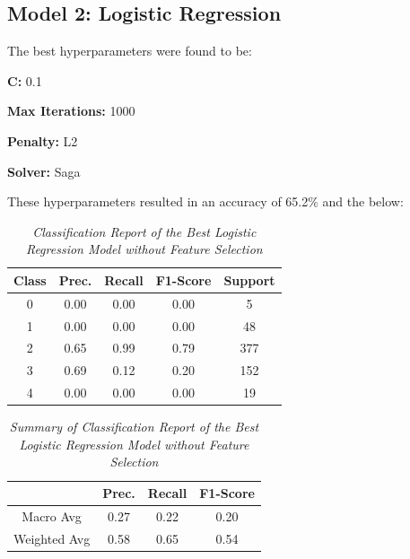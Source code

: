 \documentclass[11pt]{article}
\begin{document}
\subsection{Model 2: Logistic Regression}
The best hyperparameters were found to be:

\textbf{C: } 0.1

\textbf{Max Iterations: } 1000

\textbf{Penalty: } L2

\textbf{Solver: } Saga

\noindent
These hyperparameters resulted in an accuracy of 65.2\% and the below:

\begin{table}[!ht]
    \begin{center}
        \begin{tabular}{c|c|c|c|c}			
            \hline
            Class & Prec. & Recall & F1-Score & Support \\
            \hline\hline
            0 & 0.00 & 0.00 & 0.00 & 5 \\
            1 & 0.00 & 0.00 & 0.00 & 48 \\
            2 & 0.65 & 0.99 & 0.79 & 377 \\
            3 & 0.69 & 0.12 & 0.20 & 152 \\
            4 & 0.00 & 0.00 & 0.00 & 19\\
                \hline
        \end{tabular}

        \caption{\textit{Classification Report of the Best Logistic Regression Model without Feature Selection}}
        \label{logr-report}

    \end{center}
\end{table}
\begin{table}[!ht]
    \begin{center}
        \begin{tabular}{c||c|c|c}			
            \hline
             & Prec. & Recall & F1-Score \\
            \hline\hline
            Macro Avg & 0.27 & 0.22 & 0.20 \\
            Weighted Avg & 0.58 & 0.65 & 0.54 \\
                \hline
        \end{tabular}

        \caption{\textit{Summary of Classification Report of the Best Logistic Regression Model without Feature Selection}}
        \label{logr-report-sum}

    \end{center}
\end{table}
\end{document}
